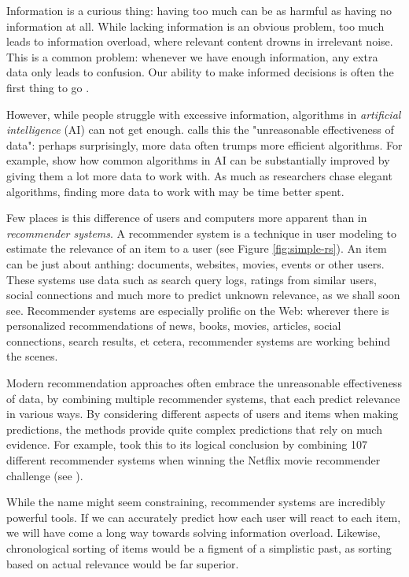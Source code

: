 \label{chap:intro}

Information is a curious thing:
having too much can be as harmful as having no information at all.
While lacking information is an obvious problem,
too much leads to information overload,
where relevant content drowns in irrelevant noise.
This is a common problem: whenever we have enough information,
any extra data only leads to confusion.
Our ability to make informed decisions is often the first thing to go
\cite[p1]{Davenport2001}.

However, while people struggle with excessive information,
algorithms in \emph{artificial intelligence} (AI) can not get enough.
\citet[p1]{Halevy2009} calls this the "unreasonable effectiveness of data":
perhaps surprisingly, more data often trumps more efficient algorithms.
For example, \citet[p3]{Banko2001} show how common algorithms in AI 
can be substantially improved by giving them a lot more data to work with.
As much as researchers chase elegant algorithms, finding more data to work with may be time better spent.

Few places is this difference of users and computers more apparent than in \emph{recommender systems}.
A recommender system is a technique in user modeling to estimate the relevance of an item to a user
(see Figure \ref{fig:simple-rs}).
An item can be just about anthing: documents, websites, movies, events or other users.
These systems use data such as search query logs, 
ratings from similar users, social connections and much more
to predict unknown relevance, as we shall soon see.
Recommender systems are especially prolific on the Web: 
wherever there is personalized recommendations of news, books, movies,
articles, social connections, search results, et cetera, recommender systems are working behind the scenes.

Modern recommendation approaches often embrace the 
unreasonable effectiveness of data,
by combining multiple recommender systems, that each predict relevance in various ways.
By considering different aspects of users and items when making predictions,
the methods provide quite complex predictions that rely on much evidence.
For example, \citet[p1]{Bell2007} took this to its logical conclusion by 
combining 107 different recommender systems when winning the 
Netflix movie recommender challenge
(see \citet{Linden2009}).

While the name might seem constraining, recommender systems are incredibly powerful tools.
If we can accurately predict how each user will react to each item,
we will have come a long way towards solving information overload.
Likewise, chronological sorting of items would be a figment of a simplistic past,
as sorting based on actual relevance would be far superior.

